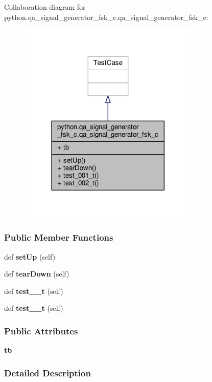 Collaboration diagram for python.\+qa\+\_\+signal\+\_\+generator\+\_\+fsk\+\_\+c.\+qa\+\_\+signal\+\_\+generator\+\_\+fsk\+\_\+c\+:
\nopagebreak
\begin{figure}[H]
\begin{center}
\leavevmode
\includegraphics[width=245pt]{d0/da7/classpython_1_1qa__signal__generator__fsk__c_1_1qa__signal__generator__fsk__c__coll__graph}
\end{center}
\end{figure}
\subsubsection*{Public Member Functions}
\begin{DoxyCompactItemize}
\item 
def {\bf set\+Up} (self)
\item 
def {\bf tear\+Down} (self)
\item 
def {\bf test\+\_\+\_\+t} (self)
\item 
def {\bf test\+\_\+\_\+t} (self)
\end{DoxyCompactItemize}
\subsubsection*{Public Attributes}
\begin{DoxyCompactItemize}
\item 
{\bf tb}
\end{DoxyCompactItemize}


\subsubsection{Detailed Description}


